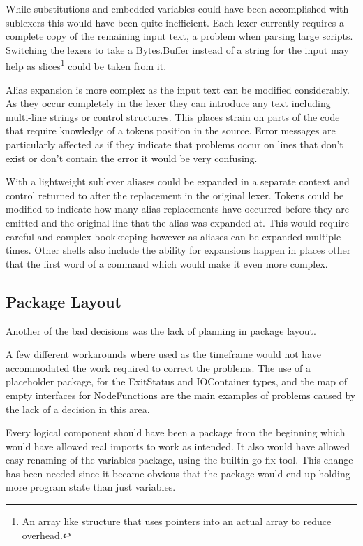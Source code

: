 While substitutions and embedded variables could have been accomplished with sublexers this would have been quite inefficient. 
Each lexer currently requires a complete copy of the remaining input text, a problem when parsing large scripts.
Switching the lexers to take a Bytes.Buffer instead of a string for the input may help as slices\footnote{An array like structure that uses pointers into an actual array to reduce overhead.} could be taken from it.

Alias expansion is more complex as the input text can be modified considerably.
As they occur completely in the lexer they can introduce any text including multi-line strings or control structures.
This places strain on parts of the code that require knowledge of a tokens position in the source.
Error messages are particularly affected as if they indicate that problems occur on lines that don't exist or don't contain the error it would be very confusing. 

With a lightweight sublexer aliases could be expanded in a separate context and control returned to after the replacement in the original lexer.
Tokens could be modified to indicate how many alias replacements have occurred before they are emitted and the original line that the alias was expanded at.
This would require careful and complex bookkeeping however as aliases can be expanded multiple times.
Other shells also include the ability for expansions happen in places other that the first word of a command which would make it even more complex.

\subsection{Package Layout}
Another of the bad decisions was the lack of planning in package layout.

A few different workarounds where used as the timeframe would not have accommodated the work required to correct the problems.
The use of a placeholder package, for the ExitStatus and IOContainer types, and the map of empty interfaces for NodeFunctions are the main examples of problems caused by the lack of a decision in this area.

Every logical component should have been a package from the beginning which would have allowed real imports to work as intended.
It also would have allowed easy renaming of the variables package, using the builtin go fix tool.
This change has been needed since it became obvious that the package would end up holding more program state than just variables.

